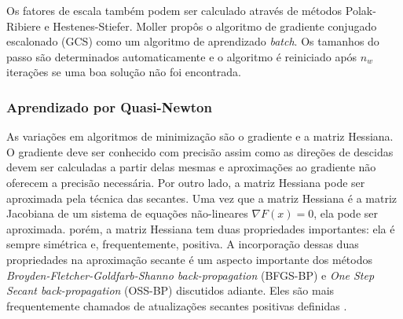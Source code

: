 Os fatores de escala também podem ser calculado através de métodos Polak-Ribiere e Hestenes-Stiefer. Moller \cite{moller1993scaled} propôs o algoritmo de gradiente conjugado escalonado (GCS) como um algoritmo de aprendizado \textit{batch}. Os tamanhos do passo são determinados automaticamente e o algoritmo é reiniciado após $n_w$ iterações se uma boa solução não foi encontrada.

\subsubsection{Aprendizado por Quasi-Newton}

As variações em algoritmos de minimização são o gradiente e a matriz Hessiana. O gradiente deve ser conhecido com precisão assim como as direções de descidas devem ser calculadas a partir delas mesmas e aproximações ao gradiente não oferecem a precisão necessária. Por outro lado, a matriz Hessiana pode ser aproximada pela técnica das secantes. Uma vez que a matriz Hessiana é a matriz Jacobiana de um sistema de equações não-lineares $\nabla F(x) = 0$, ela pode ser aproximada. porém, a matriz Hessiana tem duas propriedades importantes: ela é sempre simétrica e, frequentemente, positiva. A incorporação dessas duas propriedades na aproximação secante é um aspecto importante dos métodos \textit{Broyden-Fletcher-Goldfarb-Shanno back-propagation} (BFGS-BP) e \textit{One Step Secant back-propagation} (OSS-BP) discutidos adiante. Eles são mais frequentemente chamados de atualizações secantes positivas definidas \cite{saini2002artificial}.

